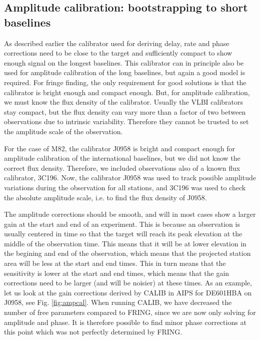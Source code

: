 \subsection{Amplitude calibration: bootstrapping to short baselines}
As described earlier the calibrator used for deriving delay, rate and phase
corrections need to be close to the target and sufficiently compact to show
enough signal on the longest baselines. This calibrator can in principle also
be used for amplitude calibration of the long baselines, but again a good model
is required. For fringe finding, the only requirement for good solutions is
that the calibrator is bright enough and compact enough.  But, for amplitude
calibration, we must know the flux density of the calibrator.  Usually the VLBI
calibrators stay compact, but the flux density can vary more than a factor of
two between observations due to intrinsic variability. Therefore they cannot be
trusted to set the amplitude scale of the observation. 

For the case of M82, the calibrator J0958 is bright and compact enough for amplitude
calibration of the international baselines, but we did not know the correct flux density. 
Therefore, we included observations also of a known flux calibrator, 3C196. Now, the calibrator J0958
was used to track possible amplitude variations during the observation for all stations, and
3C196 was used to check the absolute amplitude scale, i.e. to find the flux density of J0958. 

The amplitude corrections should be smooth, and will in most cases show a larger gain at the start and end of an experiment.
This is because an observation is usually centered in time so that the target will reach its peak elevation at the middle of the
observation time. This means that it will be at lower elevation in the begining and end of the observation, which means that
the projected station area will be less at the start and end times. This in turn means that the sensitivity is lower at the start
and end times, which means that the gain corrections need to be larger (and will be noisier) at these times. As an example,
let us look at the gain corrections derived by CALIB in AIPS for DE601HBA on J0958, see Fig. \ref{fig:ampcal}.
When running CALIB, we have decreased the number of free parameters compared to FRING, since we are now only solving for amplitude and phase. 
It is therefore possible to find minor phase corrections at this point which was not perfectly determined by FRING.

